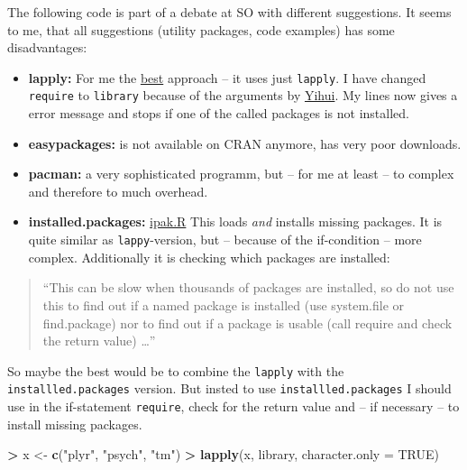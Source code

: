 \documentclass[]{book}
\newenvironment{Shaded}{\begin{snugshade}}{\end{snugshade}}
\newcommand{\KeywordTok}[1]{\textcolor[rgb]{0.13,0.29,0.53}{\textbf{#1}}}
\newcommand{\DataTypeTok}[1]{\textcolor[rgb]{0.13,0.29,0.53}{#1}}
\newcommand{\StringTok}[1]{\textcolor[rgb]{0.31,0.60,0.02}{#1}}
\newcommand{\OtherTok}[1]{\textcolor[rgb]{0.56,0.35,0.01}{#1}}
\newcommand{\OperatorTok}[1]{\textcolor[rgb]{0.81,0.36,0.00}{\textbf{#1}}}
\newcommand{\NormalTok}[1]{#1}
\providecommand{\tightlist}{%
  \setlength{\itemsep}{0pt}\setlength{\parskip}{0pt}}
\theoremstyle{definition}
\theoremstyle{definition}
\theoremstyle{definition}
\theoremstyle{remark}
\begin{document}
The following code is part of a debate at SO with different suggestions.
It seems to me, that all suggestions (utility packages, code examples)
has some disadvantages:

\begin{itemize}
\tightlist
\item
  \textbf{lapply:} For me the
  \href{https://stackoverflow.com/questions/8175912/load-multiple-packages-at-once}{best}
  approach -- it uses just \texttt{lapply}. I have changed
  \texttt{require} to \texttt{library} because of the arguments by
  \href{https://yihui.name/en/2014/07/library-vs-require/}{Yihui}. My
  lines now gives a error message and stops if one of the called
  packages is not installed.
\item
  \textbf{easypackages:} is not available on CRAN anymore, has very poor
  downloads.
\item
  \textbf{pacman:} a very sophisticated programm, but -- for me at least
  -- to complex and therefore to much overhead.
\item
  \textbf{installed.packages:}
  \href{https://gist.github.com/stevenworthington/3178163}{ipak.R} This
  loads \emph{and} installs missing packages. It is quite similar as
  \texttt{lappy}-version, but -- because of the if-condition -- more
  complex. Additionally it is checking which packages are installed:
\end{itemize}

\begin{quote}
``This can be slow when thousands of packages are installed, so do not
use this to find out if a named package is installed (use system.file or
find.package) nor to find out if a package is usable (call require and
check the return value) \ldots{}''
\end{quote}

So maybe the best would be to combine the \texttt{lapply} with the
\texttt{installled.packages} version. But insted to use
\texttt{installled.packages} I should use in the if-statement
\texttt{require}, check for the return value and -- if necessary -- to
install missing packages.

\begin{Shaded}
\begin{Highlighting}[]
\OperatorTok{>}\StringTok{ }\NormalTok{x <-}\StringTok{ }\KeywordTok{c}\NormalTok{(}\StringTok{"plyr"}\NormalTok{, }\StringTok{"psych"}\NormalTok{, }\StringTok{"tm"}\NormalTok{)}
\OperatorTok{>}\StringTok{ }\KeywordTok{lapply}\NormalTok{(x, library, }\DataTypeTok{character.only =} \OtherTok{TRUE}\NormalTok{)}
\end{Highlighting}
\end{Shaded}
\end{document}
